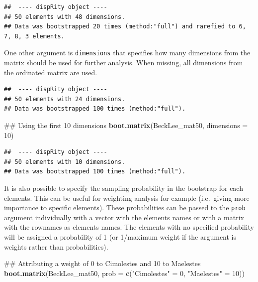 \documentclass[]{book}
\newenvironment{Shaded}{\begin{snugshade}}{\end{snugshade}}
\newcommand{\KeywordTok}[1]{\textcolor[rgb]{0.13,0.29,0.53}{\textbf{#1}}}
\newcommand{\DataTypeTok}[1]{\textcolor[rgb]{0.13,0.29,0.53}{#1}}
\newcommand{\DecValTok}[1]{\textcolor[rgb]{0.00,0.00,0.81}{#1}}
\newcommand{\FloatTok}[1]{\textcolor[rgb]{0.00,0.00,0.81}{#1}}
\newcommand{\StringTok}[1]{\textcolor[rgb]{0.31,0.60,0.02}{#1}}
\newcommand{\NormalTok}[1]{#1}
\theoremstyle{definition}
\theoremstyle{definition}
\theoremstyle{definition}
\theoremstyle{remark}
\begin{document}
\begin{verbatim}
##  ---- dispRity object ---- 
## 50 elements with 48 dimensions.
## Data was bootstrapped 20 times (method:"full") and rarefied to 6, 7, 8, 3 elements.
\end{verbatim}

One other argument is \texttt{dimensions} that specifies how many
dimensions from the matrix should be used for further analysis. When
missing, all dimensions from the ordinated matrix are used.

\begin{Shaded}
\end{Shaded}

\begin{verbatim}
##  ---- dispRity object ---- 
## 50 elements with 24 dimensions.
## Data was bootstrapped 100 times (method:"full").
\end{verbatim}

\begin{Shaded}
\begin{Highlighting}[]
\NormalTok{## Using the first 10 dimensions}
\KeywordTok{boot.matrix}\NormalTok{(BeckLee_mat50, }\DataTypeTok{dimensions =} \DecValTok{10}\NormalTok{)}
\end{Highlighting}
\end{Shaded}

\begin{verbatim}
##  ---- dispRity object ---- 
## 50 elements with 10 dimensions.
## Data was bootstrapped 100 times (method:"full").
\end{verbatim}

It is also possible to specify the sampling probability in the bootstrap
for each elements. This can be useful for weighting analysis for example
(i.e.~giving more importance to specific elements). These probabilities
can be passed to the \texttt{prob} argument individually with a vector
with the elements names or with a matrix with the rownames as elements
names. The elements with no specified probability will be assigned a
probability of 1 (or 1/maximum weight if the argument is weights rather
than probabilities).

\begin{Shaded}
\begin{Highlighting}[]
\NormalTok{## Attributing a weight of 0 to Cimolestes and 10 to Maelestes}
\KeywordTok{boot.matrix}\NormalTok{(BeckLee_mat50, }\DataTypeTok{prob =} \KeywordTok{c}\NormalTok{(}\StringTok{"Cimolestes"}\NormalTok{ =}\StringTok{ }\DecValTok{0}\NormalTok{, }\StringTok{"Maelestes"}\NormalTok{ =}\StringTok{ }\DecValTok{10}\NormalTok{))}
\end{Highlighting}
\end{Shaded}
\end{document}

